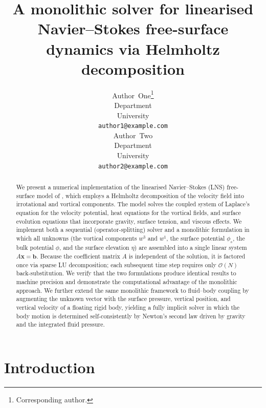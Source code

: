 \documentclass{article}
\title{A monolithic solver for linearised Navier--Stokes free-surface dynamics via Helmholtz decomposition}
\author{
  {Author~One}\thanks{Corresponding author.} \\
  {Department} \\
  {University} \\
  \texttt{author1@example.com} \\
  \And
  {Author~Two} \\
  {Department} \\
  {University} \\
  \texttt{author2@example.com} \\
}
\newcommand{\xx}{\mathbf{x}}
\newcommand{\bb}{\mathbf{b}}
\newcommand{\OO}{\mathcal{O}}
\begin{document}
\maketitle

\begin{abstract}
We present a numerical implementation of the linearised Navier--Stokes (LNS) free-surface model of \citet{GaleanoRiosEtAl2017}, which employs a Helmholtz decomposition of the velocity field into irrotational and vortical components.
The model solves the coupled system of Laplace's equation for the velocity potential, heat equations for the vortical fields, and surface evolution equations that incorporate gravity, surface tension, and viscous effects.
We implement both a sequential (operator-splitting) solver and a monolithic formulation in which all unknowns (the vortical components $w^3$ and $w^1$, the surface potential $\phi_s$, the bulk potential $\phi$, and the surface elevation $\eta$) are assembled into a single linear system $A\xx = \bb$.
Because the coefficient matrix $A$ is independent of the solution, it is factored once via sparse LU decomposition; each subsequent time step requires only $\OO(N)$ back-substitution.
We verify that the two formulations produce identical results to machine precision and demonstrate the computational advantage of the monolithic approach.
We further extend the same monolithic framework to fluid--body coupling by augmenting the unknown vector with the surface pressure, vertical position, and vertical velocity of a floating rigid body, yielding a fully implicit solver in which the body motion is determined self-consistently by Newton's second law driven by gravity and the integrated fluid pressure.

\end{abstract}


\section{Introduction}
\label{sec:intro}
\end{document}

